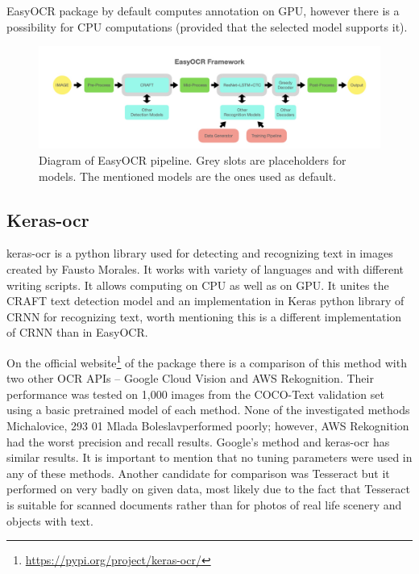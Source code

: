 EasyOCR package by default computes annotation on GPU, however there is a possibility for CPU computations (provided that the selected model supports it). 

\begin{figure}[hbtp]
    \centering
    \includegraphics[scale=0.4]{obrazky/easyocr_framework.jpeg}
    \caption{Diagram of EasyOCR pipeline. Grey slots are placeholders for models. The mentioned models are the ones used as default. \cite{easyocr2}}
    \label{img:easyocrPipeline}
\end{figure}

\subsection{Keras-ocr}

keras-ocr is a python library used for detecting and recognizing text in images created by Fausto Morales. It works with variety of languages and with different writing scripts. It allows computing on CPU as well as on GPU.  It unites the CRAFT text detection model and an implementation in Keras python library of CRNN for recognizing text, worth mentioning this is a different implementation of CRNN than in EasyOCR.\cite{keras-ocr1}

On the official website\footnote{\url{https://pypi.org/project/keras-ocr/}} of the package there is a comparison of this method with two other OCR APIs -- Google Cloud Vision and AWS Rekognition. Their performance was tested on 1,000 images from the COCO-Text validation set using a basic pretrained model of each method. None of the investigated methods Michalovice, 293 01 Mlada Boleslavperformed poorly; however, AWS Rekognition had the worst precision and recall results. Google's method and keras-ocr has similar results. It is important to mention that no tuning parameters were used in any of these methods. Another candidate for comparison was Tesseract but it performed on very badly on given data, most likely due to the fact that Tesseract is suitable for scanned documents rather than for photos of real life scenery and objects with text. \cite{keras-ocr1}

